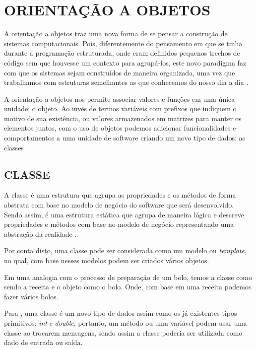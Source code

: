 \chapter{ORIENTAÇÃO A OBJETOS}
\label{orientacaoAObjetos}

A orientação a objetos traz uma nova forma de se pensar a construção de sistemas
computacionais. Pois, diferentemente do pensamento em que se tinha durante a 
programação estruturada, onde eram definidos pequenos trechos de código sem que 
houvesse um contexto para agrupá-los, este novo paradigma faz com que os sistemas 
sejam construídos de maneira organizada, uma vez que trabalhamos com estruturas 
semelhantes as que conhecemos do nosso dia a dia
\cite{phpProgramandoComOrientacaoAObjetos}.

A orientação a objetos nos permite associar valores e funções em uma única
unidade: o objeto. Ao invés de termos variáveis com prefixos que indiquem o 
motivo de sua existência, ou valores armazenados em matrizes para manter os 
elementos juntos, com o uso de objetos podemos adicionar funcionalidades e 
comportamentos a uma unidade de software criando um novo tipo de dados: as 
classes \cite{phpMasterWriteCuttingEdgeCode}.

\section{CLASSE}

A classe é uma estrutura que agrupa as propriedades e os métodos de forma
abstrata com base no modelo de negócio do software que será desenvolvido. 
Sendo assim, é uma estrutura estática que agrupa de maneira lógica e descreve 
propriedades e métodos com base no modelo de negócio representando uma abstração 
da realidade \cite{phpProgramandoComOrientacaoAObjetos}.

Por conta disto, uma classe pode ser considerada como um modelo ou
\textit{template}, no qual, com base nesses modelos podem ser criados vários objetos.

Em uma analogia com o processo de preparação de um bolo, temos a classe como
sendo a receita e o objeto como o bolo. Onde, com base em uma receita podemos fazer 
vários bolos.

Para , uma classe é um novo tipo de dados assim como os já
existentes tipos primitivos: \textit{int} e \textit{double}, portanto, um método
ou uma variável podem usar uma classe ao trocarem mensagens, sendo assim a classe 
poderia ser utilizada como dado de entrada ou saída.

